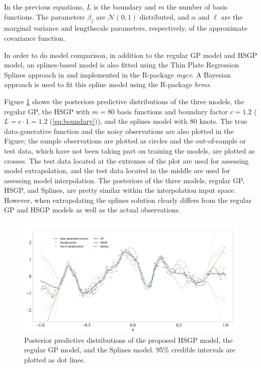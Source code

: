 \documentclass[]{interact}
\theoremstyle{plain}%
\theoremstyle{definition}
\theoremstyle{remark}
\begin{document}
\noindent In the previous equations, $L$ is the boundary and $m$ the number of basis functions. The parameters $\beta_j$ are $\mathcal{N}(0,1)$ distributed, and $\alpha$ and $\ell$ are the marginal variance and lengthscale parameters, respectively, of the approximate covariance function.

In order to do model comparison, in addition to the regular GP model and HSGP model, an splines-based model is also fitted using the Thin Plate Regression Splines approach in \cite{wood2003thin} and implemented in the R-package \textit{mgcv}. A Bayesian approach is used to fit this spline model using the R-package \textit{brms}.

Figure \ref{fig10_Posteriors_exI} shows the posteriors predictive distributions of the three models, the regular GP, the HSGP with $m=80$ basis functions and boundary factor $c=1.2$ ($L=c\cdot 1= 1.2$ (\ref{eq:boundary})), and the splines model with 80 knots. The true data-generative function and the noisy observations are also plotted in the Figure; the sample observations are plotted as circles and the out-of-sample or test data, which have not been taking part on training the models, are plotted as crosses. The test data located at the extremes of the plot are used for assessing model extrapolation, and the test data located in the middle are used for assessing model interpolation. The posteriors of the three models, regular GP, HSGP, and Splines, are pretty similar within the interpolation input space. However, when extrapolating the splines solution clearly differs from the regular GP and HSGP models as well as the actual observations. 

\begin{figure}
\centering
\includegraphics[width=\textwidth]{fig10_Posteriors_exI.pdf}
\caption{Posterior predictive distributions of the proposed HSGP model, the regular GP model, and the Splines model. 95\% credible intervals are plotted as dot lines.}
  \label{fig10_Posteriors_exI}
\end{figure}
\end{document}
